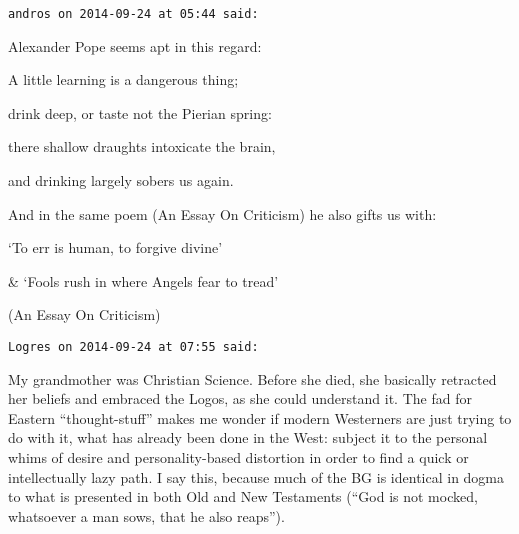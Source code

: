 \begin{footnotesize}\begin{sffamily}



\texttt{andros on 2014-09-24 at 05:44 said: }

Alexander Pope seems apt in this regard:

A little learning is a dangerous thing;

drink deep, or taste not the Pierian spring:

there shallow draughts intoxicate the brain,

and drinking largely sobers us again.

And in the same poem (An Essay On Criticism) he also gifts us with:

`To err is human, to forgive divine'

\& `Fools rush in where Angels fear to tread'

(An Essay On Criticism)


\hfill

\texttt{Logres on 2014-09-24 at 07:55 said: }

My grandmother was Christian Science. Before she died, she basically retracted her beliefs and embraced the Logos, as she could understand it. The fad for Eastern “thought-stuff” makes me wonder if modern Westerners are just trying to do with it, what has already been done in the West: subject it to the personal whims of desire and personality-based distortion in order to find a quick or intellectually lazy path. I say this, because much of the BG is identical in dogma to what is presented in both Old and New Testaments (“God is not mocked, whatsoever a man sows, that he also reaps”).


\end{sffamily}\end{footnotesize}
